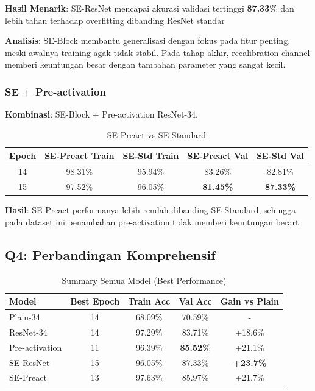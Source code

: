\textbf{Hasil Menarik}: SE-ResNet mencapai akurasi validasi tertinggi \textbf{87.33\%} dan lebih tahan terhadap overfitting dibanding ResNet standar

\textbf{Analisis}:
SE-Block membantu generalisasi dengan fokus pada fitur penting, meski awalnya training agak tidak stabil. Pada tahap akhir, recalibration channel memberi keuntungan besar dengan tambahan parameter yang sangat kecil.

\subsubsection{SE + Pre-activation}

\textbf{Kombinasi}: SE-Block + Pre-activation ResNet-34.

\begin{table}[h]
\centering
\caption{SE-Preact vs SE-Standard}
\scriptsize
\begin{tabular}{|c|c|c|c|c|}
\hline
\textbf{Epoch} & \textbf{SE-Preact Train} & \textbf{SE-Std Train} & \textbf{SE-Preact Val} & \textbf{SE-Std Val} \\
\hline
14 & 98.31\% & 95.94\% & 83.26\% & 82.81\% \\
15 & 97.52\% & 96.05\% & \textbf{81.45\%} & \textbf{87.33\%} \\
\hline
\end{tabular}
\end{table}

\textbf{Hasil}: SE-Preact performanya lebih rendah dibanding SE-Standard, sehingga pada dataset ini penambahan pre-activation tidak memberi keuntungan berarti

\FloatBarrier

\subsection{Q4: Perbandingan Komprehensif}

\begin{table}[h]
\centering
\caption{Summary Semua Model (Best Performance)}
\scriptsize
\begin{tabular}{|l|c|c|c|c|}
\hline
\textbf{Model} & \textbf{Best Epoch} & \textbf{Train Acc} & \textbf{Val Acc} & \textbf{Gain vs Plain} \\
\hline
Plain-34 & 14 & 68.09\% & 70.59\% & - \\
ResNet-34 & 14 & 97.29\% & 83.71\% & +18.6\% \\
Pre-activation & 11 & 96.39\% & \textbf{85.52\%} & +21.1\% \\
SE-ResNet & 15 & 96.05\% & 87.33\% & \textbf{+23.7\%} \\
SE-Preact & 13 & 97.63\% & 85.97\% & +21.7\% \\
\hline
\end{tabular}
\end{table}

